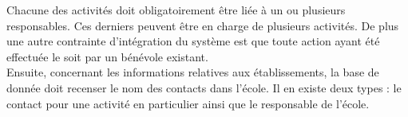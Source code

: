 Chacune des activités doit obligatoirement être liée à un ou plusieurs responsables. Ces derniers peuvent être en charge de plusieurs activités. De plus une autre contrainte d'intégration du système est que toute action ayant été effectuée le soit par un bénévole existant. \\

Ensuite, concernant les informations relatives aux établissements, la base de donnée doit recenser le nom des contacts dans l'école. Il en existe deux types : le contact pour une activité en particulier ainsi que le responsable de l'école.
